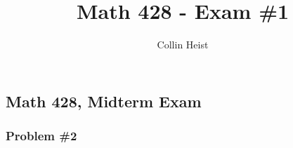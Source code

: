 \documentclass[11pt]{article}
\author{Collin Heist}
\title{Math 428 - Exam \#1}
\begin{document}
    
    
    \maketitle
    
    

    
    \hypertarget{math-428-midterm-exam}{%
\subsection{Math 428, Midterm Exam}\label{math-428-midterm-exam}}

\hypertarget{problem-2}{%
\subsubsection{Problem \#2}\label{problem-2}}
\end{document}
